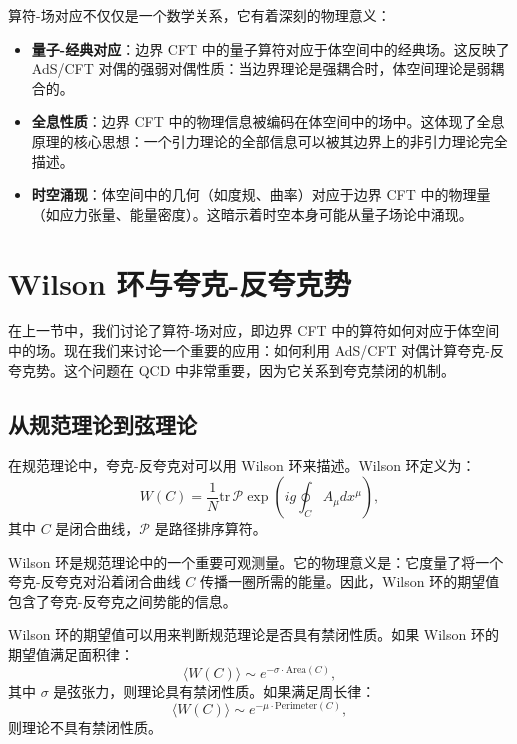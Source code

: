 \begin{remark}[算符-场对应的物理意义]
算符-场对应不仅仅是一个数学关系，它有着深刻的物理意义：
\begin{itemize}
    \item \textbf{量子-经典对应}：边界 CFT 中的量子算符对应于体空间中的经典场。这反映了 AdS/CFT 对偶的强弱对偶性质：当边界理论是强耦合时，体空间理论是弱耦合的。
    \item \textbf{全息性质}：边界 CFT 中的物理信息被编码在体空间中的场中。这体现了全息原理的核心思想：一个引力理论的全部信息可以被其边界上的非引力理论完全描述。
    \item \textbf{时空涌现}：体空间中的几何（如度规、曲率）对应于边界 CFT 中的物理量（如应力张量、能量密度）。这暗示着时空本身可能从量子场论中涌现。
\end{itemize}
\end{remark}

\section{Wilson 环与夸克-反夸克势}

在上一节中，我们讨论了算符-场对应，即边界 CFT 中的算符如何对应于体空间中的场。现在我们来讨论一个重要的应用：如何利用 AdS/CFT 对偶计算夸克-反夸克势。这个问题在 QCD 中非常重要，因为它关系到夸克禁闭的机制。

\subsection{从规范理论到弦理论}

在规范理论中，夸克-反夸克对可以用 Wilson 环来描述。Wilson 环定义为：
\begin{equation}
    W(C) = \frac{1}{N} \text{tr} \, \mathcal{P} \exp\left(ig \oint_C A_\mu dx^\mu\right),
\end{equation}
其中 $C$ 是闭合曲线，$\mathcal{P}$ 是路径排序算符。

\begin{definition}[Wilson 环]
Wilson 环是规范理论中的一个重要可观测量。它的物理意义是：它度量了将一个夸克-反夸克对沿着闭合曲线 $C$ 传播一圈所需的能量。因此，Wilson 环的期望值包含了夸克-反夸克之间势能的信息。
\end{definition}

\begin{remark}
Wilson 环的期望值可以用来判断规范理论是否具有禁闭性质。如果 Wilson 环的期望值满足面积律：
\begin{equation}
    \langle W(C) \rangle \sim e^{-\sigma \cdot \text{Area}(C)},
\end{equation}
其中 $\sigma$ 是弦张力，则理论具有禁闭性质。如果满足周长律：
\begin{equation}
    \langle W(C) \rangle \sim e^{-\mu \cdot \text{Perimeter}(C)},
\end{equation}
则理论不具有禁闭性质。
\end{remark}

